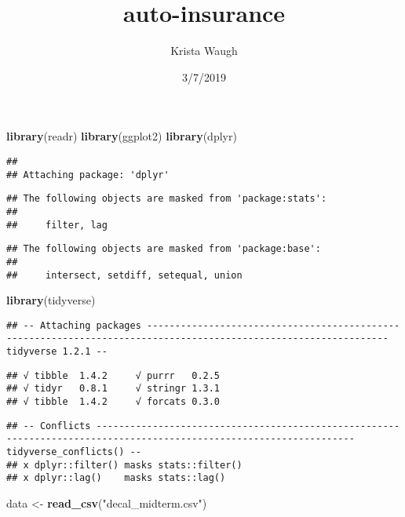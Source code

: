 \documentclass[]{article}
\title{auto-insurance}
\author{Krista Waugh}
\date{3/7/2019}
\newenvironment{Shaded}{\begin{snugshade}}{\end{snugshade}}
\newcommand{\KeywordTok}[1]{\textcolor[rgb]{0.13,0.29,0.53}{\textbf{#1}}}
\newcommand{\StringTok}[1]{\textcolor[rgb]{0.31,0.60,0.02}{#1}}
\newcommand{\NormalTok}[1]{#1}
\begin{document}
\maketitle

\begin{Shaded}
\begin{Highlighting}[]
\KeywordTok{library}\NormalTok{(readr)}
\KeywordTok{library}\NormalTok{(ggplot2)}
\KeywordTok{library}\NormalTok{(dplyr)}
\end{Highlighting}
\end{Shaded}

\begin{verbatim}
## 
## Attaching package: 'dplyr'
\end{verbatim}

\begin{verbatim}
## The following objects are masked from 'package:stats':
## 
##     filter, lag
\end{verbatim}

\begin{verbatim}
## The following objects are masked from 'package:base':
## 
##     intersect, setdiff, setequal, union
\end{verbatim}

\begin{Shaded}
\begin{Highlighting}[]
\KeywordTok{library}\NormalTok{(tidyverse)}
\end{Highlighting}
\end{Shaded}

\begin{verbatim}
## -- Attaching packages ----------------------------------------------------------------------------------------------------------------- tidyverse 1.2.1 --
\end{verbatim}

\begin{verbatim}
## √ tibble  1.4.2     √ purrr   0.2.5
## √ tidyr   0.8.1     √ stringr 1.3.1
## √ tibble  1.4.2     √ forcats 0.3.0
\end{verbatim}

\begin{verbatim}
## -- Conflicts -------------------------------------------------------------------------------------------------------------------- tidyverse_conflicts() --
## x dplyr::filter() masks stats::filter()
## x dplyr::lag()    masks stats::lag()
\end{verbatim}

\begin{Shaded}
\begin{Highlighting}[]
\NormalTok{data <-}\StringTok{ }\KeywordTok{read_csv}\NormalTok{(}\StringTok{"decal_midterm.csv"}\NormalTok{)}
\end{Highlighting}
\end{Shaded}
\end{document}
